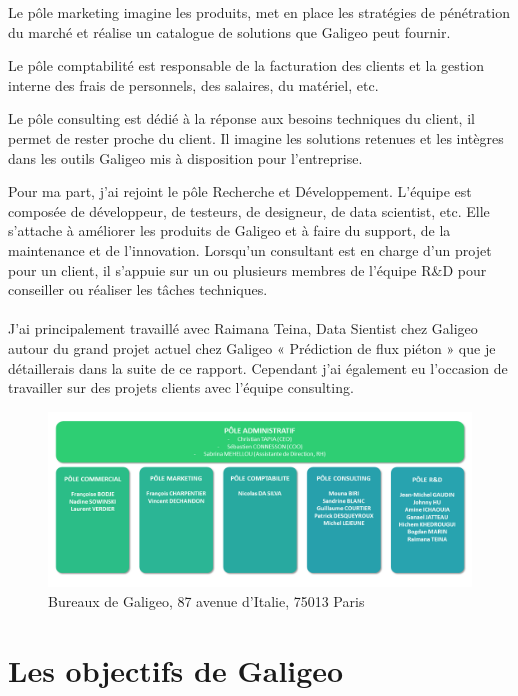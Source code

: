 Le pôle marketing imagine les produits, met en place les stratégies de pénétration du marché et réalise un catalogue de solutions que Galigeo peut fournir.

Le pôle comptabilité est responsable de la facturation des clients et la gestion interne des frais de personnels, des salaires, du matériel, etc.

Le pôle consulting est dédié à la réponse aux besoins techniques du client, il permet de rester proche du client. Il imagine les solutions retenues et les intègres dans les outils Galigeo mis à disposition pour l’entreprise.


Pour ma part, j’ai rejoint le pôle Recherche et Développement. L’équipe est composée de développeur, de testeurs, de designeur, de data scientist, etc. Elle s’attache à améliorer les produits de Galigeo et à faire du support, de la maintenance et de l’innovation. Lorsqu’un consultant est en charge d’un projet pour un client, il s’appuie sur un ou plusieurs membres de l’équipe R\&D pour conseiller ou réaliser les tâches techniques.

\paragraph*{}

J’ai principalement travaillé avec Raimana Teina, Data Sientist chez Galigeo autour du grand projet actuel chez Galigeo « Prédiction de flux piéton » que je détaillerais dans la suite de ce rapport. Cependant j’ai également eu l’occasion de travailler sur des projets clients avec l’équipe consulting.

\begin{figure}[H]
    \centering
    \includegraphics[width=\linewidth]{images/graphs/organigramme.png}
    \caption{Bureaux de Galigeo, 87 avenue d'Italie, 75013 Paris}
    \label{fig:organigrame}
\end{figure}


\section{Les objectifs de Galigeo}

